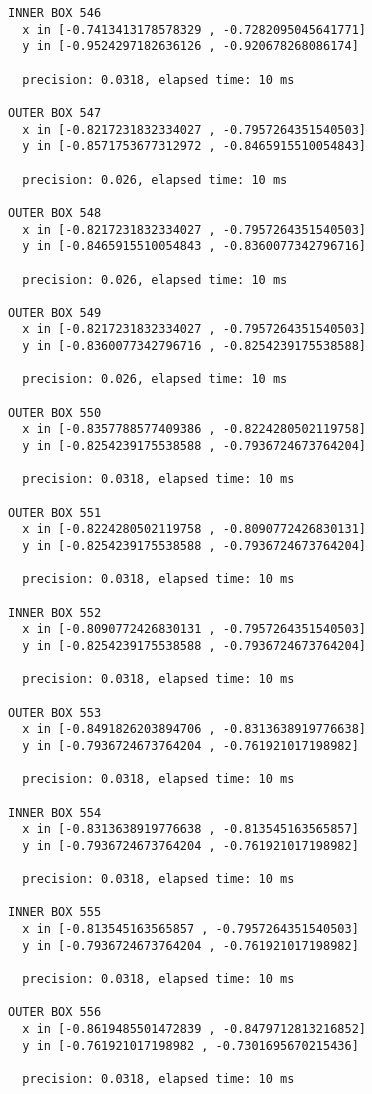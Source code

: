 \begin{verbatim}
INNER BOX 546
  x in [-0.7413413178578329 , -0.7282095045641771]
  y in [-0.9524297182636126 , -0.920678268086174]

  precision: 0.0318, elapsed time: 10 ms

OUTER BOX 547
  x in [-0.8217231832334027 , -0.7957264351540503]
  y in [-0.8571753677312972 , -0.8465915510054843]

  precision: 0.026, elapsed time: 10 ms

OUTER BOX 548
  x in [-0.8217231832334027 , -0.7957264351540503]
  y in [-0.8465915510054843 , -0.8360077342796716]

  precision: 0.026, elapsed time: 10 ms

OUTER BOX 549
  x in [-0.8217231832334027 , -0.7957264351540503]
  y in [-0.8360077342796716 , -0.8254239175538588]

  precision: 0.026, elapsed time: 10 ms

OUTER BOX 550
  x in [-0.8357788577409386 , -0.8224280502119758]
  y in [-0.8254239175538588 , -0.7936724673764204]

  precision: 0.0318, elapsed time: 10 ms

OUTER BOX 551
  x in [-0.8224280502119758 , -0.8090772426830131]
  y in [-0.8254239175538588 , -0.7936724673764204]

  precision: 0.0318, elapsed time: 10 ms

INNER BOX 552
  x in [-0.8090772426830131 , -0.7957264351540503]
  y in [-0.8254239175538588 , -0.7936724673764204]

  precision: 0.0318, elapsed time: 10 ms

OUTER BOX 553
  x in [-0.8491826203894706 , -0.8313638919776638]
  y in [-0.7936724673764204 , -0.761921017198982]

  precision: 0.0318, elapsed time: 10 ms

INNER BOX 554
  x in [-0.8313638919776638 , -0.813545163565857]
  y in [-0.7936724673764204 , -0.761921017198982]

  precision: 0.0318, elapsed time: 10 ms

INNER BOX 555
  x in [-0.813545163565857 , -0.7957264351540503]
  y in [-0.7936724673764204 , -0.761921017198982]

  precision: 0.0318, elapsed time: 10 ms

OUTER BOX 556
  x in [-0.8619485501472839 , -0.8479712813216852]
  y in [-0.761921017198982 , -0.7301695670215436]

  precision: 0.0318, elapsed time: 10 ms


\end{verbatim}
